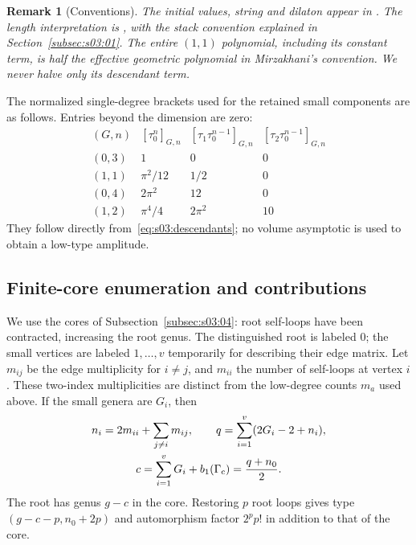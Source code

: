 \documentclass[a4paper,10pt]{article}
\numberwithin{equation}{section}
\theoremstyle{paperplain}
\theoremstyle{paperremark}
\newtheorem{rmk}{Remark}[section]
\theoremstyle{paperplain}
\begin{document}
\begin{rmk}[Conventions]
The initial values, string and dilaton appear in
\cite[Section~4.1 and (B.1)]{W26}. The length interpretation is
\cite[Theorem~4.4]{Mir07}, with the stack convention explained in
Section~\ref{subsec:s03:01}. The entire $(1,1)$ polynomial, including
its constant term, is half the effective geometric polynomial in
Mirzakhani's convention. We never halve only its descendant term.
\end{rmk}

The normalized single-degree brackets used for the retained small
components are as follows.
Entries beyond the dimension are zero:
\begin{equation}\label{eq:a:small-amplitudes}
\begin{array}{c|ccc}
 (G,n)&[\tau_0^n]_{G,n}&[\tau_1\tau_0^{n-1}]_{G,n}
                                      &[\tau_2\tau_0^{n-1}]_{G,n}\\\hline
 (0,3)&1&0&0\\
 (1,1)&\pi^2/12&1/2&0\\
 (0,4)&2\pi^2&12&0\\
 (1,2)&\pi^4/4&2\pi^2&10
\end{array}
\end{equation}
They follow directly from~\eqref{eq:s03:descendants}; no volume
asymptotic is used to obtain a low-type amplitude.

\subsection{Finite-core enumeration and contributions}
\label{subsec:a:04}

We use the cores of Subsection~\ref{subsec:s03:04}: root self-loops
have been contracted, increasing the root genus. The distinguished
root is labeled $0$; the small vertices are labeled $1,\ldots,v$
temporarily for describing their edge matrix. Let $m_{ij}$ be the edge
multiplicity for $i\ne j$, and $m_{ii}$ the number of self-loops at
vertex $i$. These two-index multiplicities are distinct from the
low-degree counts $m_a$ used above. If the small genera are $G_i$,
then
\begin{equation}\label{eq:a:core-data}
\begin{gathered}
 n_i=2m_{ii}+\sum_{j\ne i}m_{ij},\qquad
 q=\sum_{i=1}^v(2G_i-2+n_i),\\
 c=\sum_{i=1}^vG_i+b_1(\Gamma_{\rm c})=\frac{q+n_0}{2}.
\end{gathered}
\end{equation}
The root has genus $g-c$ in the core. Restoring $p$ root loops gives
type $(g-c-p,n_0+2p)$ and automorphism factor $2^pp!$ in addition
to that of the core.
\end{document}
